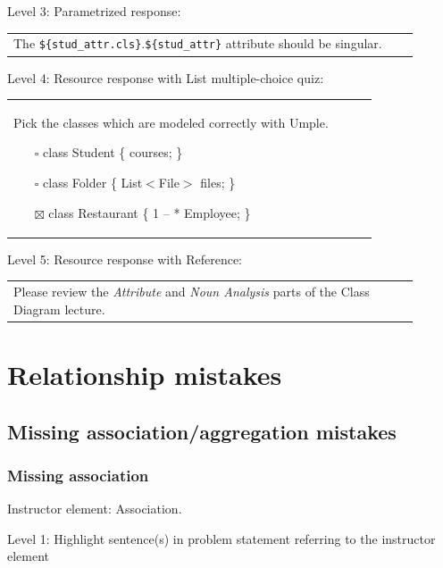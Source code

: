 \noindent Level 3: Parametrized response: \medskip

\begin{tabular}{|p{0.9\linewidth}}
The \verb|${stud_attr.cls}|.\verb|${stud_attr}| attribute should be singular.
\end{tabular} \medskip

\noindent Level 4: Resource response with List multiple-choice quiz: \medskip

\begin{tabular}{|p{0.9\linewidth}}

Pick the classes which are modeled correctly with Umple.

\begin{itemize}
    \item[$\square$] class Student \{ courses; \}
    \item[$\square$] class Folder \{ List$<$File$>$ files; \}
    \item[$\boxtimes$] class Restaurant \{ 1 -- * Employee; \}
\end{itemize}

\end{tabular} \medskip

\noindent Level 5: Resource response with Reference: \medskip

\begin{tabular}{|p{0.9\linewidth}}
Please review the \textit{Attribute} and \textit{Noun Analysis} parts of the Class Diagram lecture.
\end{tabular} \medskip




\section{Relationship mistakes}

\subsection{Missing association/aggregation mistakes}

\subsubsection{Missing association}

Instructor element: Association. \medskip

\noindent Level 1: Highlight sentence(s) in problem statement referring to the instructor element \medskip

